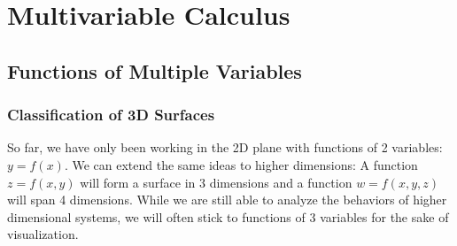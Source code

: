 \documentclass[11pt, fleqn]{article}
\begin{document}


\section{Multivariable Calculus}

\subsection{Functions of Multiple Variables}

\subsubsection{Classification of 3D Surfaces}
So far, we have only been working in the 2D plane with functions of 2 variables: $y=f(x)$. We can extend the same ideas to higher dimensions: A function $z=f(x,y)$ will form a surface in 3 dimensions and a function $w=f(x,y,z)$ will span 4 dimensions. While we are still able to analyze the behaviors of higher dimensional systems, we will often stick to functions of 3 variables for the sake of visualization.\\
\end{document}
